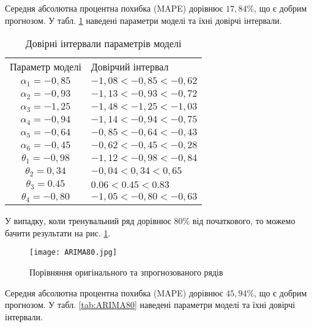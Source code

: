 Середня абсолютна процентна похибка (MAPE) дорівнює $17,84\%$, що є добрим прогнозом. У табл. \ref{tab:ARIMA90} наведені параметри моделі та їхні довірчі інтервали.

\begin{table}[h]
\caption{Довірні інтервали параметрів моделі}\label{tab:ARIMA90}
\begin{tabular}{|c|m{}|}
\hline
Параметр моделі & Довірчий інтервал \\
		\hlinewd{2pt}
$\alpha_{1} = -0,85$ & $-1,08 < -0,85 < -0,62$ \\
\hline
$\alpha_{2} = -0,93$ & $-1,13 < -0,93 < -0,72$ \\
\hline
$\alpha_{3} = -1,25$ & $-1,48 < -1,25 < -1,03$ \\
\hline
$\alpha_{4} = -0,94$ & $-1,14 < -0,94 < -0,75$ \\
\hline
$\alpha_{5} = -0,64$ & $-0,85 < -0,64 < -0,43$ \\
\hline
$\alpha_{6} = -0,45$ & $-0,62 < -0,45 < -0,28$ \\
\hline
$\theta_{1} = -0,98$ & $-1,12 < -0,98 < -0,84$ \\
\hline
$\theta_{2} = 0,34$ & $-0,04 < 0,34 < 0,65$ \\
\hline
$\theta_{3} = 0.45$ & $0.06 < 0.45 < 0.83$ \\
\hline
$\theta_{4} = -0,80$ & $-1,05 < -0,80 < -0,63$ \\
\hline
\end{tabular}
\end{table}

У випадку, коли тренувальний ряд дорівнює $80\%$ від початкового, то можемо бачити результати на рис. \ref{fig:ARIMA80}.

\newpage

\vspace{1em}

\begin{figure}[h]
  \texttt{[image: ARIMA80.jpg]}
  \caption{Порівняння оригінального та зпрогнозованого рядів}
  \label{fig:ARIMA80}
\end{figure}

Середня абсолютна процентна похибка (MAPE) дорівнює $45,94\%$, що є добрим прогнозом. У табл. \ref{tab:ARIMA80} наведені параметри моделі та їхні довірчі інтервали.

